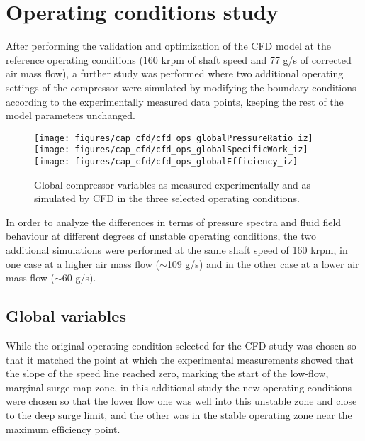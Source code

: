 \section{Operating conditions study} %

After performing the validation and optimization of the CFD model at the reference operating conditions (160 krpm of shaft speed and 77 g/s of corrected air mass flow), a further study was performed where two additional operating settings of the compressor were simulated by modifying the boundary conditions according to the experimentally measured data points, keeping the rest of the model parameters unchanged.

\begin{wrapfigure}[29]{o}[0.8cm]{0.45\textwidth}
\vspace{-3mm}
\centering
\texttt{[image: figures/cap\_cfd/cfd\_ops\_globalPressureRatio\_iz]}\\[4mm]
\texttt{[image: figures/cap\_cfd/cfd\_ops\_globalSpecificWork\_iz]}\\[4mm]
\texttt{[image: figures/cap\_cfd/cfd\_ops\_globalEfficiency\_iz]}\\[2mm]
\caption[Validation of global compressor variables]{Global compressor variables as measured experimentally and as simulated by CFD in the three selected operating conditions.}
\label{fig:cfd_ops_globals}
\end{wrapfigure}

In order to analyze the differences in terms of pressure spectra and fluid field behaviour at different degrees of unstable operating conditions, the two additional simulations were performed at the same shaft speed of 160 krpm, in one case at a higher air mass flow  ($\sim$109 g/s) and in the other case at a lower air mass flow ($\sim$60 g/s).

\subsection{Global variables}

While the original operating condition selected for the CFD study was chosen so that it matched the point at which the experimental measurements showed that the slope of the speed line reached zero, marking the start of the low-flow, marginal surge map zone, in this additional study the new operating conditions were chosen so that the lower flow one was well into this unstable zone and close to the deep surge limit, and the other was in the stable operating zone near the maximum efficiency point.

